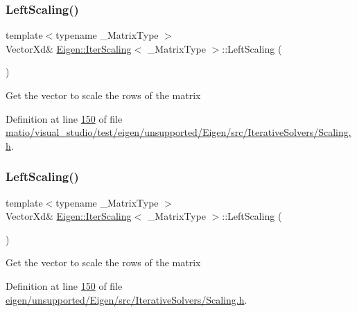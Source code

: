 \subsubsection{\texorpdfstring{Left\+Scaling()}{LeftScaling()}\hspace{0.1cm}{\footnotesize\ttfamily [1/2]}}
{\footnotesize\ttfamily template$<$typename \+\_\+\+Matrix\+Type $>$ \\
Vector\+Xd\& \hyperlink{class_eigen_1_1_iter_scaling}{Eigen\+::\+Iter\+Scaling}$<$ \+\_\+\+Matrix\+Type $>$\+::Left\+Scaling (\begin{DoxyParamCaption}{ }\end{DoxyParamCaption})\hspace{0.3cm}{\ttfamily [inline]}}

Get the vector to scale the rows of the matrix 

Definition at line \hyperlink{matio_2visual__studio_2test_2eigen_2unsupported_2_eigen_2src_2_iterative_solvers_2_scaling_8h_source_l00150}{150} of file \hyperlink{matio_2visual__studio_2test_2eigen_2unsupported_2_eigen_2src_2_iterative_solvers_2_scaling_8h_source}{matio/visual\+\_\+studio/test/eigen/unsupported/\+Eigen/src/\+Iterative\+Solvers/\+Scaling.\+h}.

\mbox{\label{class_eigen_1_1_iter_scaling_ab88d288be912d90a1e597e5dab0bd47b}} 
\subsubsection{\texorpdfstring{Left\+Scaling()}{LeftScaling()}\hspace{0.1cm}{\footnotesize\ttfamily [2/2]}}
{\footnotesize\ttfamily template$<$typename \+\_\+\+Matrix\+Type $>$ \\
Vector\+Xd\& \hyperlink{class_eigen_1_1_iter_scaling}{Eigen\+::\+Iter\+Scaling}$<$ \+\_\+\+Matrix\+Type $>$\+::Left\+Scaling (\begin{DoxyParamCaption}{ }\end{DoxyParamCaption})\hspace{0.3cm}{\ttfamily [inline]}}

Get the vector to scale the rows of the matrix 

Definition at line \hyperlink{eigen_2unsupported_2_eigen_2src_2_iterative_solvers_2_scaling_8h_source_l00150}{150} of file \hyperlink{eigen_2unsupported_2_eigen_2src_2_iterative_solvers_2_scaling_8h_source}{eigen/unsupported/\+Eigen/src/\+Iterative\+Solvers/\+Scaling.\+h}.

